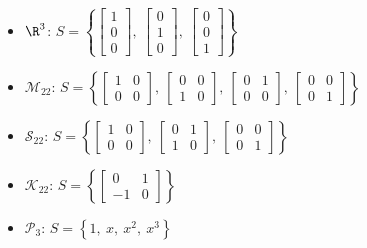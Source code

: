 \documentclass{article}
\begin{document}
\begin{itemize}
    \item \(\R^3\): \(S = \left\{
          \begin{bmatrix*}
              1 \\ 0 \\ 0
          \end{bmatrix*}
          ,\:
          \begin{bmatrix*}
              0 \\ 1 \\ 0
          \end{bmatrix*}
          ,\:
          \begin{bmatrix*}
              0 \\ 0 \\ 1
          \end{bmatrix*}
          \right\}\)
    \item \(\mathscr{M}_{22}\): \(S = \left\{
          \begin{bmatrix*}
              1 & 0 \\
              0 & 0
          \end{bmatrix*}
          ,\:
          \begin{bmatrix*}
              0 & 0 \\
              1 & 0
          \end{bmatrix*}
          ,\:
          \begin{bmatrix*}
              0 & 1 \\
              0 & 0
          \end{bmatrix*}
          ,\:
          \begin{bmatrix*}
              0 & 0 \\
              0 & 1
          \end{bmatrix*}
          \right\}\)
    \item \(\mathscr{S}_{22}\): \(S = \left\{
          \begin{bmatrix*}
              1 & 0 \\
              0 & 0
          \end{bmatrix*}
          ,\:
          \begin{bmatrix*}
              0 & 1 \\
              1 & 0
          \end{bmatrix*}
          ,\:
          \begin{bmatrix*}
              0 & 0 \\
              0 & 1
          \end{bmatrix*}
          \right\}\)
    \item \(\mathscr{K}_{22}\): \(S = \left\{
          \begin{bmatrix*}
              0 & 1 \\
              -1 & 0
          \end{bmatrix*}
          \right\}\)
    \item \(\mathscr{P}_3\): \(S = \left\{ 1,\: x,\: x^2,\: x^3 \right\}\)
\end{itemize}
\end{document}
